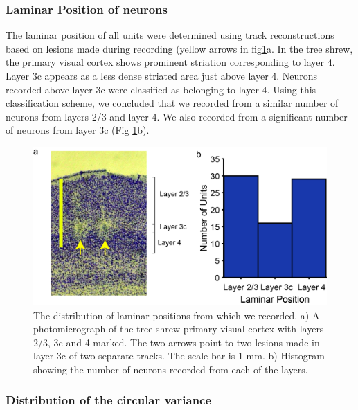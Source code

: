 \subsubsection{Laminar Position of neurons}

The laminar position of all units were determined using track reconstructions based on lesions made during recording (yellow arrows in fig\ref{fig:lp}a. In the tree shrew, the primary visual cortex shows prominent striation corresponding to layer 4. Layer 3c appears as a less dense striated area just above layer 4. Neurons recorded above layer 3c were classified as belonging to layer 4. Using this classification scheme, we concluded that we recorded from a similar number of neurons from layers 2/3 and layer 4. We also recorded from a significant number of neurons from layer 3c (Fig \ref{fig:lp}b).

	\begin{figure}[H]
	
	\includegraphics[width=\linewidth]{ShrewV1/LaminarPosition.jpg}
	\caption{The distribution of laminar positions from which we recorded. a) A photomicrograph of the tree shrew primary visual cortex with layers 2/3, 3c and 4 marked. The two arrows point to two lesions made in layer 3c of two separate tracks. The scale bar is 1 mm. b) Histogram showing the number of neurons recorded from each of the layers.}
	\label{fig:lp}
\end{figure} 

\subsubsection{Distribution of the circular variance}


